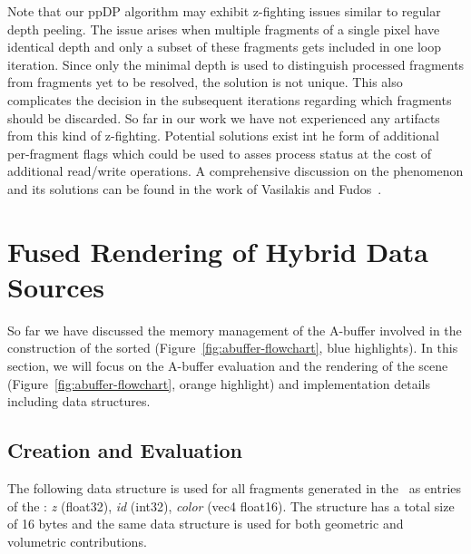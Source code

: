 \documentclass{egpubl}
\newcommand{\ab}{\mbox{A-buffer}}
\newcommand{\dloop}{ppDP}
\begin{document}
Note that our \dloop{} algorithm may exhibit z-fighting issues similar to regular depth peeling. 
The issue arises when multiple fragments of a single pixel have identical depth and only a subset of these fragments gets included in one loop iteration. 
Since only the minimal depth is used to distinguish processed fragments from fragments yet to be resolved, the solution is not unique.
This also complicates the decision in the subsequent iterations regarding which fragments should be discarded.
So far in our work we have not experienced any artifacts from this kind of z-fighting. 
Potential solutions exist int he form of additional per-fragment flags which could be used to asses process status at the cost of additional read/write operations. 
A comprehensive discussion on the phenomenon and its solutions can be found in the work of Vasilakis and Fudos~\cite{Vasilakis2013}. 

\section{Fused Rendering of Hybrid Data Sources}
\label{sec:fusion}

So far we have discussed the memory management of the \ab{} involved in the construction of the sorted \bFraglist{} (Figure~\ref{fig:abuffer-flowchart}, blue highlights). 
In this section, we will focus on the \ab{} evaluation and the rendering of the scene (Figure~\ref{fig:abuffer-flowchart}, orange highlight) and implementation details including data structures.

\newcommand{\ccz}{\emph{z}}
\newcommand{\ccid}{\emph{id}}
\newcommand{\cccol}{\emph{color}}

\subsection{\bFraglist{} Creation and Evaluation}

The following data structure is used for all fragments generated in the \sFill\ as entries of the \bFraglist: 
\ccz{} (float32), \ccid{} (int32), \cccol{} (vec4 float16).
The structure has a total size of 16 bytes and the same data structure is used for both geometric and volumetric contributions. 
\end{document}

